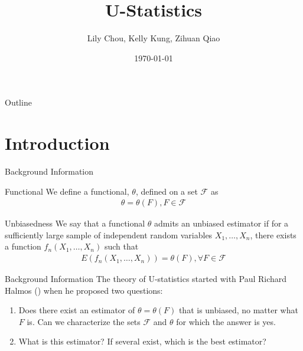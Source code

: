 \documentclass{beamer}
\title{U-Statistics}
\author{Lily Chou, Kelly Kung, Zihuan Qiao}
\institute{Probability Theory II}
\date{\today}
\begin{document}
\begin{frame}
  \titlepage
\end{frame}

\begin{frame}{Outline}
  \tableofcontents
\end{frame}

\section{Introduction}
\begin{frame}{Background Information}
    \begin{block}{Functional}
    We define a functional, $\theta$, defined on a set $\mathcal{F}$ as 
    \begin{align}
        \theta = \theta(F), F \in \mathcal{F}
    \end{align}
    \end{block}
    \begin{block}{Unbiasedness}
    We say that a functional $\theta$ admits an unbiased estimator if for a sufficiently large sample of independent random variables $X_1, \dotsc, X_n$, there exists a function $f_n(X_1, \dotsc, X_n)$ such that 
    \begin{align}\label{unbiased}
        E(f_n(X_1, \dotsc, X_n)) = \theta(F), \forall F \in \mathcal{F}
    \end{align}
    \end{block}
\end{frame}
\begin{frame}{Background Information}
The theory of U-statistics started with Paul Richard Halmos (\cite{halmos1946theory}) when he proposed two questions:
\begin{enumerate}
        \item Does there exist an estimator of $\theta = \theta(F)$ that is unbiased, no matter what $F$ is. Can we characterize the sets $\mathcal{F}$ and $\theta$ for which the answer is yes.
        
        \item What is this estimator? If several exist, which is the best estimator?
\end{enumerate}
\end{frame}
\end{document}
